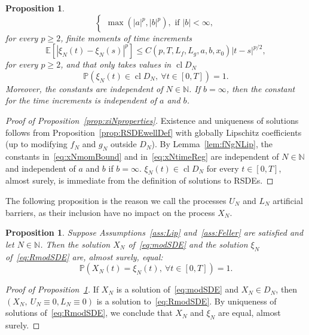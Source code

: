 \documentclass[11pt]{amsart}
\newtheorem{proposition}[theorem]{Proposition}
\newcommand{\E}{{\mathbb E}}
\newcommand{\PP}{{\mathbb P}}
\newcommand{\DDN}{D_{N}}
\newcommand{\CDDN}{\operatorname{cl} D_{N}}
\begin{document}
{\begin{proposition}
\begin{equation}
\begin{cases}
\max(|a|^{p},|b|^{p}), \text{ if } |b| < \infty,
\end{cases}
\end{equation}
for every $p \geq 2$, finite moments of time increments
\begin{equation}\label{eq:xNtimeReg}
\E \left[ \left| \xi_{N}(t) - \xi_{N}(s) \right|^{p} \right] \leq C(p,T,L_{f},L_{g},a,b,x_{0}) |t-s|^{p/2},
\end{equation}
for every $p \geq 2$, and that only takes values in $\CDDN$
\begin{equation*}
\PP \left( \xi_{N}(t) \in \CDDN,\ \forall t \in [0,T] \right)= 1.
\end{equation*}
Moreover, the constants are independent of $N \in \mathbb{N}$. If $b=\infty$, then the constant for the time increments is independent of $a$ and $b$.
\end{proposition}
\begin{proof}[Proof of Proposition~\ref{prop:xiNproperties}]
Existence and uniqueness of solutions follows from Proposition~\ref{prop:RSDEwellDef} with globally Lipschitz coefficients (up to modifying $f_{N}$ and $g_{N}$ outside $\DDN$). By Lemma~\ref{lem:fNgNLip}, the constants in~\eqref{eq:xNmomBound} and in~\eqref{eq:xNtimeReg} are independent of $N \in \mathbb{N}$ and independent of $a$ and $b$ if $b=\infty$. $\xi_{N}(t) \in \CDDN$ for every $t \in [0,T]$, almost surely, is immediate from the definition of solutions to RSDEs.
\end{proof}
The following proposition is the reason we call the processes $U_{N}$ and $L_{N}$ artificial barriers, as their inclusion have no impact on the process $X_{N}$. 
\begin{proposition}\label{prop:xNxiNequal}
Suppose Assumptions~\ref{ass:Lip} and~\ref{ass:Feller} are satisfied and let $N \in \mathbb{N}$. Then the solution $X_{N}$ of~\eqref{eq:modSDE} and the solution $\xi_{N}$ of~\eqref{eq:RmodSDE} are, almost surely, equal:
\begin{equation*}
\PP \left( X_{N}(t) = \xi_{N}(t),\ \forall t \in [0,T] \right)=1.
\end{equation*}
\end{proposition}
\begin{proof}[Proof of Proposition~\ref{prop:xNxiNequal}]
If $X_{N}$ is a solution of~\eqref{eq:modSDE} and $X_{N} \in D_{N}$, then $(X_{N},\ U_{N} \equiv 0, L_{N} \equiv 0)$ is a solution to~\eqref{eq:RmodSDE}. By uniqueness of solutions of~\eqref{eq:RmodSDE}, we conclude that $X_{N}$ and $\xi_{N}$ are equal, almost surely.
\end{proof}

}
\end{document}
